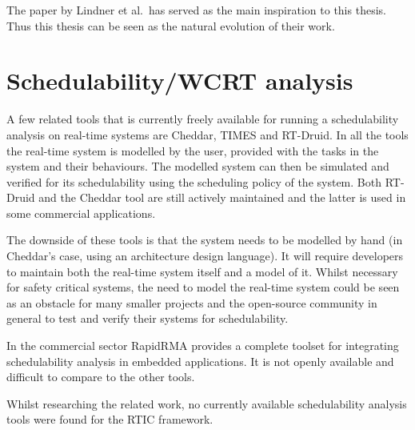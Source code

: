 The paper by Lindner et al.\ has served as the main inspiration to this thesis.
Thus this thesis can be seen as the natural evolution of their work.

\section{Schedulability/WCRT analysis}
A few related tools that is currently freely available for running a
schedulability analysis on real-time systems are Cheddar\cite{cheddar},
TIMES\cite{timestool} and RT-Druid\cite{rtdruid}. In all the tools the
real-time system is modelled by the user, provided with the tasks in the system
and their behaviours. The modelled system can then be simulated and verified
for its schedulability using the scheduling policy of the system. Both RT-Druid
and the Cheddar tool are still actively maintained and the latter is used in
some commercial applications\cite{ellidiss}.

The downside of these tools is that the system needs to be modelled by hand
(in Cheddar's case, using an architecture design language). It will require
developers to maintain both the real-time system itself and a model of it.
Whilst necessary for safety critical systems, the need to model the real-time
system could be seen as an obstacle for many smaller projects and the
open-source community in general to test and verify their systems for
schedulability.

In the commercial sector RapidRMA\cite{rapidrma} provides a complete toolset
for integrating schedulability analysis in embedded applications. It is not
openly available and difficult to compare to the other tools.

Whilst researching the related work, no currently available schedulability
analysis tools were found for the RTIC framework.
